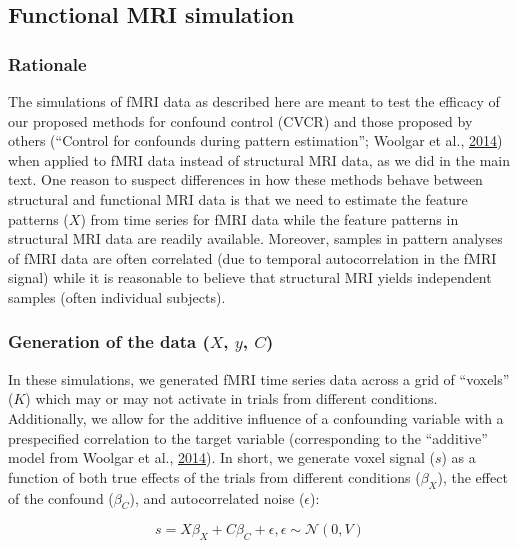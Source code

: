 \documentclass[12pt,american,a4paper,oneside,]{memoir} %
\begin{document}
\hypertarget{functional-mri-simulation}{%
\subsection{Functional MRI simulation}\label{functional-mri-simulation}}

\hypertarget{rationale}{%
\subsubsection{Rationale}\label{rationale}}

The simulations of fMRI data as described here are meant to test the efficacy of our proposed methods for confound control (CVCR) and those proposed by others (``Control for confounds during pattern estimation''; Woolgar et al., \protect\hyperlink{ref-Woolgar2014-jb}{2014}) when applied to fMRI data instead of structural MRI data, as we did in the main text. One reason to suspect differences in how these methods behave between structural and functional MRI data is that we need to estimate the feature patterns (\(X\)) from time series for fMRI data while the feature patterns in structural MRI data are readily available. Moreover, samples in pattern analyses of fMRI data are often correlated (due to temporal autocorrelation in the fMRI signal) while it is reasonable to believe that structural MRI yields independent samples (often individual subjects).

\hypertarget{generation-of-the-data-x-y-c}{%
\subsubsection{\texorpdfstring{Generation of the data (\(X\), \(y\), \(C\))}{Generation of the data (X, y, C)}}\label{generation-of-the-data-x-y-c}}

In these simulations, we generated fMRI time series data across a grid of ``voxels'' (\(K\)) which may or may not activate in trials from different conditions. Additionally, we allow for the additive influence of a confounding variable with a prespecified correlation to the target variable (corresponding to the ``additive'' model from Woolgar et al., \protect\hyperlink{ref-Woolgar2014-jb}{2014}). In short, we generate voxel signal (\(s\)) as a function of both true effects of the trials from different conditions (\(\beta_{X}\)), the effect of the confound (\(\beta_{C}\)), and autocorrelated noise (\(\epsilon\)):

\begin{equation}
s = X\beta_{X} + C\beta_{C} + \epsilon, \epsilon \sim \mathcal{N}(0, V)
\end{equation}
\end{document}
